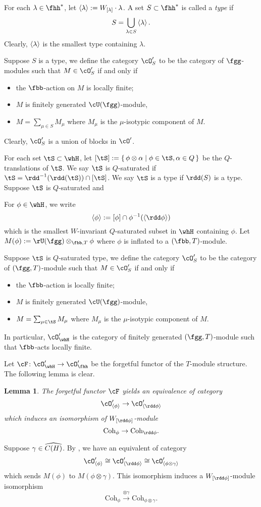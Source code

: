 \documentclass[12pt,a4paper]{amsart}
\numberwithin{equation}{section}
\newtheorem{lem}[thm]{Lemma}
\theoremstyle{remark}
\def\Coh{\mathrm{Coh}}
\begin{document}
For each $\lambda\in \fhh^{*}$, let
$\braket{\lambda} := W_{[\lambda]}\cdot \lambda$.
A set $S\subset \fhh^{*}$ is called a \emph{type} if
\[
  S = \bigcup_{\lambda\in S} \braket{\lambda}.
\]
Clearly, $\braket{\lambda}$ is the smallest type containing $\lambda$.


Suppose $S$ is a type,
we define the category $\cO'_{S}$ to be the category of $\fgg$-modules
such that $M\in \cO'_{S}$ if and only if
\begin{itemize}
  \item the $\fbb$-action on $M$ is locally finite;
  \item $M$ is finitely generated $\cU(\fgg)$-module,
  \item $M = \sum_{\mu \in S} M_{\mu}$
        where $M_{\mu}$ is the $\mu$-isotypic component of $M$.
\end{itemize}
Clearly, $\cO'_{S}$ is a union of blocks in $\cO'$.


For each set $\tS\subset \whH$, let
$[\tS] := \set{\phi\otimes \alpha| \phi \in \tS, \alpha\in Q}$ be the
$Q$-translations of $\tS$.
We say $\tS$ is $Q$-saturated if $\tS = \rdd^{{-1}}(\rdd(\tS))\cap [\tS]$.
We say $\tS$ is a type if $\rdd(S)$ is a type.
Suppose $\tS$ is $Q$-saturated and

For $\phi\in \whH$, we write
\[
\braket{\phi}:= [\phi]\cap \phi^{-1}(\braket{\rdd \phi})
\]
which is the smallest $W$-invariant $Q$-saturated subset in $\whH$ containing
$\phi$.
Let $M(\phi) := \rU(\fgg)\otimes_{\fbb,T} \phi$ where $\phi$ is inflated to a
$(\fbb,T)$-module.

Suppose $\tS$ is $Q$-saturated type,
we define the category $\cO'_{S}$ to be the category of $(\fgg,T)$-module
such that $M\in \cO'_{S}$ if and only if
\begin{itemize}
  \item the $\fbb$-action is locally finite;
  \item $M$ is finitely generated $\cU(\fgg)$-module,
  \item $M = \sum_{\mu \in \tS} M_{\mu}$
        where $M_{\mu}$ is the $\mu$-isotypic component of $M$.
\end{itemize}
In particular, $\cO'_{\whH}$ is the category of finitely generated $(\fgg,T)$-module
such that $\fbb$-acts locally finite.

Let $\cF\colon \cO'_{\whH}\rightarrow \cO'_{\fhh}$ be the forgetful functor of
the $T$-module structure.
The following lemma is clear.
\begin{lem}\label{lem:eqcat}
  The forgetful functor $\cF$ yields an equivalence of
  category
  \[
    \cO'_{\braket{\phi}}\rightarrow \cO'_{\braket{\rdd\phi}}
  \]
  which induces an isomorphism of $W_{[\dphi]}$-module
  \[
    \Coh_{\phi}\rightarrow \Coh_{\rdd\phi}.
  \]
\end{lem}
Suppose $\gamma\in \widehat{C(H)}$.
By , we have an equivalent of category
\[
  \cO'_{\braket{\phi}}\cong \cO'_{\braket{\rdd\phi}}\cong \cO'_{\braket{\phi\otimes \gamma}}
\]
which sends $M(\phi)$ to $M(\phi\otimes \gamma)$.
This isomorphism induces a $W_{[\dphi]}$-module isomorphism
\[
    \Coh_{\phi}\xrightarrow{\otimes \gamma} \Coh_{\phi\otimes \gamma}.
\]
\end{document}
